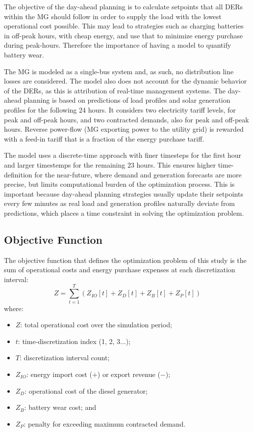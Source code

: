 \documentclass{ieeeaccess}
\begin{document}
    The objective of the day-ahead planning is to calculate setpoints that all DERs within the MG should follow in order to supply the load with the lowest operational cost possible. This may lead to strategies such as charging batteries in off-peak hours, with cheap energy, and use that to minimize energy purchase during peak-hours. Therefore the importance of having a model to quantify battery wear.

    The MG is modeled as a single-bus system and, as such, no distribution line losses are considered. The model also does not account for the dynamic behavior of the DERs, as this is attribution of real-time management systems. The day-ahead planning is based on predictions of load profiles and solar generation profiles for the following 24 hours. It considers two electricity tariff levels, for peak and off-peak hours, and two contracted demands, also for peak and off-peak hours. Reverse power-flow (MG exporting power to the utility grid) is rewarded with a feed-in tariff that is a fraction of the energy purchase tariff.

    The model uses a discrete-time approach with finer timesteps for the first hour and larger timestemps for the remaining 23 hours. This ensures higher time-definition for the near-future, where demand and generation forecasts are more precise, but limits computational burden of the optimization process. This is important because day-ahead planning strategies usually update their setpoints every few minutes as real load and generation profiles naturally deviate from predictions, which places a time constraint in solving the optimization problem.

    \subsection{Objective Function}
    The objective function that defines the optimization problem of this study is the sum of operational costs and energy purchase expenses at each discretization interval:
    \begin{equation}
        Z = \sum_{t=1}^T(Z_{IO}[t] + Z_D[t] + Z_B[t] + Z_P[t])
        \label{eq:z1}
    \end{equation}
    where:
    \begin{itemize}
        \item $Z$: total operational cost over the simulation period;
        \item $t$: time-discretization index (1, 2, 3...);
        \item $T$: discretization interval count;
        \item $Z_{IO}$: energy import cost ($+$) or export revenue ($-$);
        \item $Z_{D}$: operational cost of the diesel generator;
        \item $Z_{B}$: battery wear cost; and
        \item $Z_{P}$: penalty for exceeding maximum contracted demand.
    \end{itemize}
\end{document}
